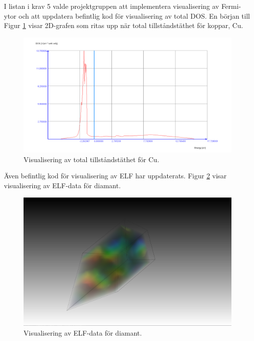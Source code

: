 \documentclass[a4paper,12pt]{article}
\begin{document}
I listan i krav 5 valde projektgruppen att implementera visualisering av Fermi-ytor och att uppdatera befintlig kod för visualisering av total DOS.
En början till  Figur \ref{fig:visualisering_total_DOS_Cu} visar 2D-grafen som ritas upp när total tillståndstäthet för koppar, Cu.
\begin{figure}[H]
	\centering
	\includegraphics[scale=0.3]{Cu_1_10_total_DOS_visualisering.png}
	\caption{Visualisering av total tillståndstäthet för Cu.}
	\label{fig:visualisering_total_DOS_Cu}
\end{figure}

Även befintlig kod för visualisering av ELF har uppdaterats. Figur \ref{fig:visualisering_diamant_elf} visar visualisering av ELF-data för diamant. 
\begin{figure}[H]
	\centering
	\includegraphics[scale=0.15]{Diamant_elf_visualisering.png}
	\caption{Visualisering av ELF-data för diamant.}
	\label{fig:visualisering_diamant_elf}
\end{figure}
\end{document}
